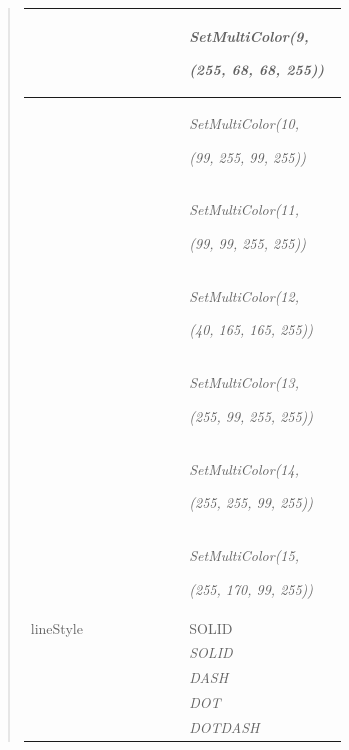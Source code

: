 \documentclass[letterpaper,10pt,english]{sphinxmanual}
\begin{document}
\begin{quote}
\begin{longtable}{|p{0.475\linewidth}|p{0.475\linewidth}|}
\\
\hline & 
\begin{DUlineblock}{0em}
\item[] \emph{SetMultiColor(9,}
\item[] \emph{(255, 68, 68, 255))}
\end{DUlineblock}
\\
\hline & 
\begin{DUlineblock}{0em}
\item[] \emph{SetMultiColor(10,}
\item[] \emph{(99, 255, 99, 255))}
\end{DUlineblock}
\\
\hline & 
\begin{DUlineblock}{0em}
\item[] \emph{SetMultiColor(11,}
\item[] \emph{(99, 99, 255, 255))}
\end{DUlineblock}
\\
\hline & 
\begin{DUlineblock}{0em}
\item[] \emph{SetMultiColor(12,}
\item[] \emph{(40, 165, 165, 255))}
\end{DUlineblock}
\\
\hline & 
\begin{DUlineblock}{0em}
\item[] \emph{SetMultiColor(13,}
\item[] \emph{(255, 99, 255, 255))}
\end{DUlineblock}
\\
\hline & 
\begin{DUlineblock}{0em}
\item[] \emph{SetMultiColor(14,}
\item[] \emph{(255, 255, 99, 255))}
\end{DUlineblock}
\\
\hline & 
\begin{DUlineblock}{0em}
\item[] \emph{SetMultiColor(15,}
\item[] \emph{(255, 170, 99, 255))}
\end{DUlineblock}
\\
\hline
lineStyle
 & 
SOLID
\\
\hline & 
\emph{SOLID}
\\
\hline & 
\emph{DASH}
\\
\hline & 
\emph{DOT}
\\
\hline & 
\emph{DOTDASH}

\end{longtable}
\end{quote}
\end{document}
